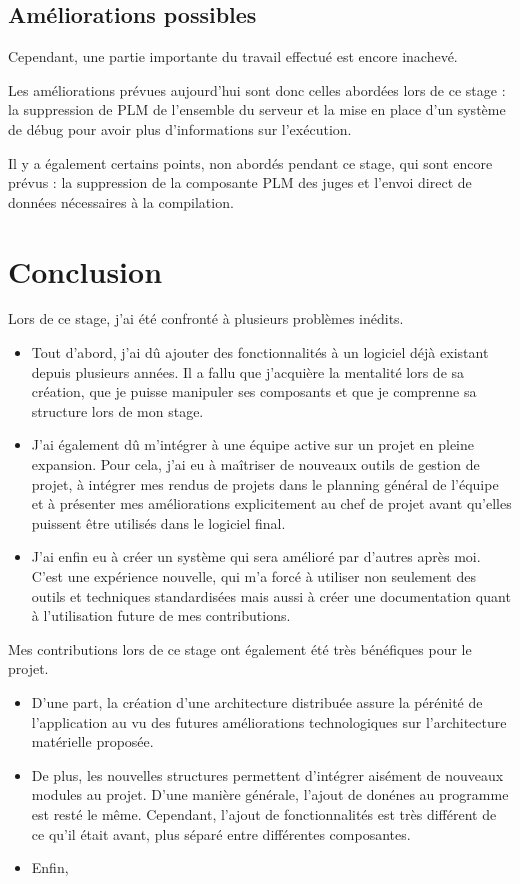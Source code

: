 \documentclass[stage]{tnreport}
\begin{document}
\section{Améliorations possibles}

Cependant, une partie importante du travail effectué est encore inachevé.

Les améliorations prévues aujourd'hui sont donc celles abordées lors de ce stage : la suppression de PLM de l'ensemble du serveur et la mise en place d'un système de débug pour avoir plus d'informations sur l'exécution.

Il y a également certains points, non abordés pendant ce stage, qui sont encore prévus : la suppression de la composante PLM des juges et l'envoi direct de données nécessaires à la compilation.



\chapter*{Conclusion}

Lors de ce stage, j'ai été confronté à plusieurs problèmes inédits.

\begin{itemize}
	\item Tout d'abord, j'ai dû ajouter des fonctionnalités à un logiciel déjà existant depuis plusieurs années. Il a fallu que j'acquière la mentalité lors de sa création, que je puisse manipuler ses composants et que je comprenne sa structure lors de mon stage.
	\item J'ai également dû m'intégrer à une équipe active sur un projet en pleine expansion. Pour cela, j'ai eu à maîtriser de nouveaux outils de gestion de projet, à intégrer mes rendus de projets dans le planning général de l'équipe et à présenter mes améliorations explicitement au chef de projet avant qu'elles puissent être utilisés dans le logiciel final.
	\item J'ai enfin eu à créer un système qui sera amélioré par d'autres après moi. C'est une expérience nouvelle, qui m'a forcé à utiliser non seulement des outils et techniques standardisées mais aussi à créer une documentation quant à l'utilisation future de mes contributions.
\end{itemize}

Mes contributions lors de ce stage ont également été très bénéfiques pour le projet.

\begin{itemize}
	\item D'une part, la création d'une architecture distribuée assure la pérénité de l'application au vu des futures améliorations technologiques sur l'architecture matérielle proposée.
	\item De plus, les nouvelles structures permettent d'intégrer aisément de nouveaux modules au projet. D'une manière générale, l'ajout de donénes au programme est resté le même. Cependant, l'ajout de fonctionnalités est très différent de ce qu'il était avant, plus séparé entre différentes composantes.
	\item Enfin, 
\end{itemize}
\end{document}
